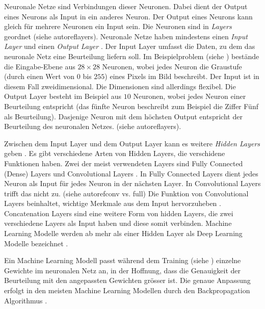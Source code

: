 Neuronale Netze sind Verbindungen dieser Neuronen. Dabei dient der Output eines
Neurons als Input in ein anderes Neuron. Der Output eines Neurons kann gleich
für mehrere Neuronen ein Input sein. Die Neuronen sind in \emph{Layers} geordnet
(siehe autoref{layers}). Neuronale Netze haben mindestens einen \emph{Input
Layer} und einen \emph{Output Layer}
\cite{nielsen_neural_2015}\cite{ognjanovski_everything_2020}. Der Input Layer
umfasst die Daten, zu dem das neuronale Netz eine Beurteilung liefern soll. Im
Beispielproblem (siehe ) bestände die Eingabe-Ebene aus
$28\times28$ Neuronen, wobei jedes Neuron die Graustufe (durch einen Wert von
$0$ bis $255$) eines Pixels im Bild beschreibt. Der Input ist in diesem Fall
zweidimensional. Die Dimensionen sind allerdings flexibel. Die Output Layer
besteht im Beispiel aus $10$ Neuronen, wobei jedes Neuron einer Beurteilung
entspricht (das fünfte Neuron beschreibt zum Beispiel die Ziffer Fünf als
Beurteilung). Dasjenige Neuron mit dem höchsten Output entspricht der
Beurteilung des neuronalen Netzes. (siehe autoref{layers}).


Zwischen dem Input Layer und dem Output Layer kann es weitere \emph{Hidden
Layers} geben \cite{malik_what_2019}. Es gibt verschiedene Arten von Hidden
Layers, die verschidene Funktionen haben. Zwei der meist verwendeten Layers sind
Fully Connected (Dense) Layers und Convolutional Layers
\cite{unzueta_convolutional_2022}. In Fully Connected Layers dient jedes Neuron
als Input für jedes Neuron in der nächsten Layer. In Convolutional Layers trifft
das nicht zu. (siehe autoref{conv vs. full}) Die Funktion von Convolutional
Layers beinhaltet, wichtige Merkmale aus dem Input hervorzuheben
\cite{deshpande_beginners_nodate}. Concatenation Layers
\cite{jayawardana_concatenating_2021} sind eine weitere Form von hidden Layers,
die zwei verschiedene Layers als Input haben und diese somit verbinden. Machine
Learning Modelle werden ab mehr als einer Hidden Layer als Deep Learning Modelle
bezeichnet \cite{jan-dirk_kranz_deep_2019}.


Ein Machine Learning Modell passt während dem Training (siehe
) einzelne Gewichte im neuronalen Netz an, in der Hoffnung,
dass die Genauigkeit der Beurteilung mit den angepassten Gewichten grösser
ist. Die genaue Anpassung erfolgt in den meisten Machine Learning Modellen durch
den Backpropagation Algorithmus
\cite{ognjanovski_everything_2020}\cite{david_e_rumelhart_learning_nodate}.

